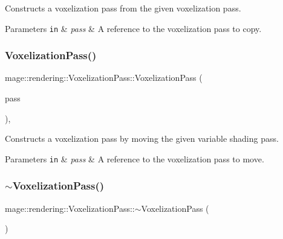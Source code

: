 Constructs a voxelization pass from the given voxelization pass.


\begin{DoxyParams}[1]{Parameters}
\mbox{\tt in}  & {\em pass} & A reference to the voxelization pass to copy. \\
\hline
\end{DoxyParams}
\hypertarget{classmage_1_1rendering_1_1_voxelization_pass_abbdf28fc21b6b4fe4eebf8ed02ac015d}{}\label{classmage_1_1rendering_1_1_voxelization_pass_abbdf28fc21b6b4fe4eebf8ed02ac015d} 
\subsubsection{\texorpdfstring{Voxelization\+Pass()}{VoxelizationPass()}\hspace{0.1cm}{\footnotesize\ttfamily [3/3]}}
{\footnotesize\ttfamily mage\+::rendering\+::\+Voxelization\+Pass\+::\+Voxelization\+Pass (\begin{DoxyParamCaption}\item[{\hyperlink{classmage_1_1rendering_1_1_voxelization_pass}{Voxelization\+Pass} \&\&}]{pass }\end{DoxyParamCaption})\hspace{0.3cm}{\ttfamily [default]}, {\ttfamily [noexcept]}}

Constructs a voxelization pass by moving the given variable shading pass.


\begin{DoxyParams}[1]{Parameters}
\mbox{\tt in}  & {\em pass} & A reference to the voxelization pass to move. \\
\hline
\end{DoxyParams}
\hypertarget{classmage_1_1rendering_1_1_voxelization_pass_ab989ce6ec60745d7339a1288554dd400}{}\label{classmage_1_1rendering_1_1_voxelization_pass_ab989ce6ec60745d7339a1288554dd400} 
\subsubsection{\texorpdfstring{$\sim$\+Voxelization\+Pass()}{~VoxelizationPass()}}
{\footnotesize\ttfamily mage\+::rendering\+::\+Voxelization\+Pass\+::$\sim$\+Voxelization\+Pass (\begin{DoxyParamCaption}{ }\end{DoxyParamCaption})\hspace{0.3cm}{\ttfamily [default]}}

